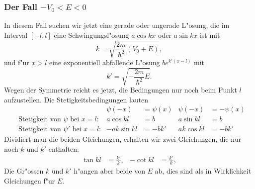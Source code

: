\subsubsection{Der Fall $-V_0 < E < 0$}
In diesem Fall suchen wir jetzt eine gerade oder ungerade L"osung, die
im Interval $[-l,l]$ eine Schwingungsl"osung $a \cos kx$ oder $a \sin kx$
ist mit 
\[
k=\sqrt{\frac{2m}{\hbar^2}(V_0+E)},
\]
und f"ur $x>l$ eine exponentiell abfallende L"osung $be^{k'(x-l)}$
mit
\[
k'=\sqrt{-\frac{2m}{\hbar^2}E}.
\]
Wegen der Symmetrie reicht es jetzt, die Bedingungen nur noch beim
Punkt $l$ aufzustellen.
Die Stetigkeitsbedingungen lauten 
\begin{align*}
&&\psi(-x)&=\psi(x)	&	\psi(-x)&=-\psi(x)\\
&\text{Stetigkeit von $\psi$ bei $x=l$:}&
	a\cos kl&= b	&	a\sin kl&=b \\
&\text{Stetigkeit von $\psi'$ bei $x=l$:}&
	-ak\sin kl&=-bk'&     ak\cos kl&=-bk'
\end{align*}
Dividiert man die beiden Gleichungen, erhalten wir zwei
Gleichungen, die nur noch $k$ und $k'$ enthalten:
\begin{align}
\tan kl&=\frac{k'}{k},
&-\cot kl&=\frac{k'}{k},
\label{potentialtopf-k-gleichungen}
\end{align}
Die Gr"ossen $k$ und $k'$ h"angen aber beide von $E$ ab, dies sind
als in Wirklichkeit Gleichungen f"ur $E$.

